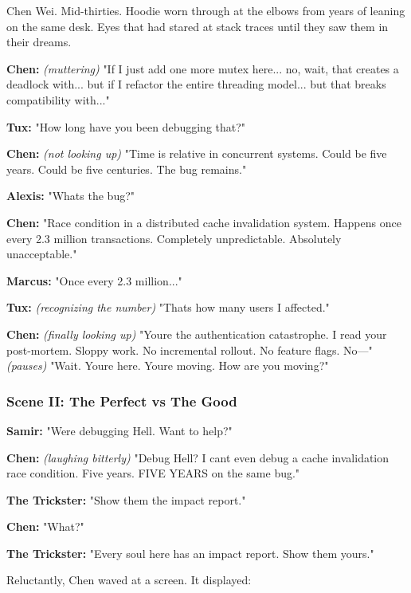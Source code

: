 Chen Wei. Mid-thirties. Hoodie worn through at the elbows from years of leaning on the same desk. Eyes that had stared at stack traces until they saw them in their dreams.

\textbf{Chen:} \emph{(muttering)} "If I just add one more mutex here... no, wait, that creates a deadlock with... but if I refactor the entire threading model... but that breaks compatibility with..."

\textbf{Tux:} "How long have you been debugging that?"

\textbf{Chen:} \emph{(not looking up)} "Time is relative in concurrent systems. Could be five years. Could be five centuries. The bug remains."

\textbf{Alexis:} "What\textquotesingle s the bug?"

\textbf{Chen:} "Race condition in a distributed cache invalidation system. Happens once every 2.3 million transactions. Completely unpredictable. Absolutely unacceptable."

\textbf{Marcus:} "Once every 2.3 million..."

\textbf{Tux:} \emph{(recognizing the number)} "That\textquotesingle s how many users I affected."

\textbf{Chen:} \emph{(finally looking up)} "You\textquotesingle re the authentication catastrophe. I read your post-mortem. Sloppy work. No incremental rollout. No feature flags. No---" \emph{(pauses)} "Wait. You\textquotesingle re here. You\textquotesingle re moving. How are you moving?"

\bookdivider

\subsubsection{Scene II: The Perfect vs The Good}\label{scene-ii-the-perfect-vs-the-good}

\textbf{Samir:} "We\textquotesingle re debugging Hell. Want to help?"

\textbf{Chen:} \emph{(laughing bitterly)} "Debug Hell? I can\textquotesingle t even debug a cache invalidation race condition. Five years. FIVE YEARS on the same bug."

\textbf{The Trickster:} "Show them the impact report."

\textbf{Chen:} "What?"

\textbf{The Trickster:} "Every soul here has an impact report. Show them yours."

Reluctantly, Chen waved at a screen. It displayed:

